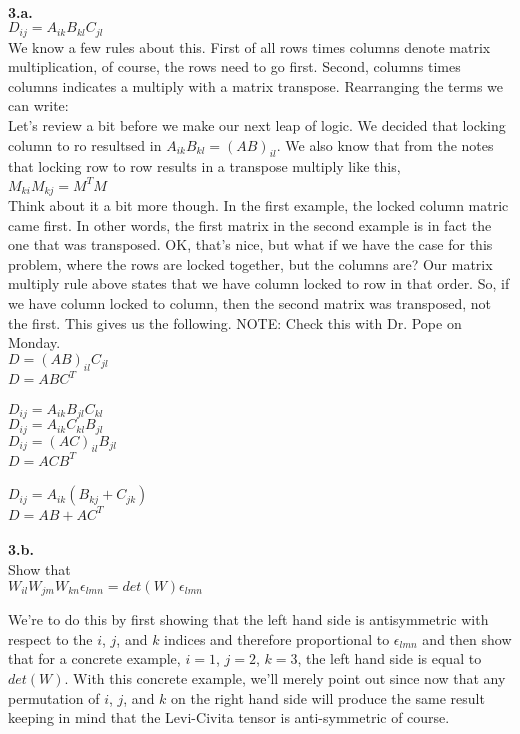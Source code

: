 \documentclass[prb,preprint]
{revtex4-1}
\newcommand{\PRLsep}{\noindent\makebox[\linewidth]{\resizebox{0.8888\linewidth}{2pt}{$\bullet$}}\bigskip}
\begin{document}
\PRLsep
\\
\newpage
\bigskip
{\bf 3.a.}
\\
$D_{ij} = A_{ik} B_{kl} C_{jl}$
\\
We know a few rules about this.  First of all rows times columns denote matrix multiplication, of course, the rows need to go first.  Second, columns times columns indicates a multiply with a matrix transpose.  Rearranging the terms we can write:
\\
Let's review a bit before we make our next leap of logic.  We decided that locking column to ro resultsed in $A_{ik} B_{kl} = \left(AB\right)_{il}$.  We also know that from the notes that locking row to row results in a transpose multiply like this, 
\\
$M_{ki}M_{kj} = M^T M$
\\
Think about it a bit more though.  In the first example, the locked column matric came first.  In other words, the first matrix in the second example is in fact the one that was transposed.  OK, that's nice, but what if we have the case for this problem, where the rows are locked together, but the columns are?  Our matrix multiply rule above states that we have column locked to row in that order.  So, if we have column locked to column, then the second matrix was transposed, not the first.  This gives us the following.  NOTE:  Check this with Dr. Pope on Monday.
\\
$D = \left(AB\right)_{il} C_{jl}$
\\
$D = ABC^T$
\\
\PRLsep
\\
$D_{ij} = A_{ik} B_{jl} C_{kl}$
\\
$D_{ij} = A_{ik} C_{kl} B_{jl}$
\\
$D_{ij} = \left(AC\right)_{il} B_{jl}$
\\
$D = ACB^T$
\\
\PRLsep
\\
$D_{ij} = A_{ik} \left(B_{kj} + C_{jk}\right)$
\\
$D = AB + AC^T$
\\
\PRLsep
\\
{\bf 3.b.}  
\\
Show that 
\\
$W_{il}W_{jm}W_{kn}\epsilon_{lmn} = det\left(W\right)\epsilon_{lmn}$

We're to do this by first showing that the left hand side is antisymmetric with respect to the $i$, $j$, and $k$ indices and therefore proportional to $\epsilon_{lmn}$ and then show that for a concrete example, $i=1$, $j=2$, $k=3$, the left hand side is equal to $det\left(W\right)$.  With this concrete example, we'll merely point out since now that any permutation of $i$, $j$, and $k$ on the right hand side will produce the same result keeping in mind that the Levi-Civita tensor is anti-symmetric of course.
\end{document}
